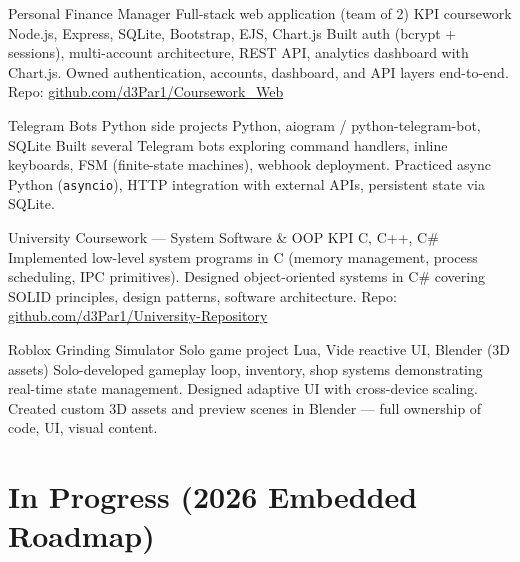\documentclass[11pt,a4paper,sans]{moderncv}
\begin{document}
        {Personal Finance Manager}
        {Full-stack web application (team of 2)}
        {KPI coursework}
        {Node.js, Express, SQLite, Bootstrap, EJS, Chart.js}
        {Built auth (bcrypt + sessions), multi-account architecture, REST API, analytics dashboard with Chart.js. Owned authentication, accounts, dashboard, and API layers end-to-end. Repo: \href{https://github.com/d3Par1/Coursework_Web}{github.com/d3Par1/Coursework\_Web}}

        {Telegram Bots}
        {Python side projects}
        {}
        {Python, aiogram / python-telegram-bot, SQLite}
        {Built several Telegram bots exploring command handlers, inline keyboards, FSM (finite-state machines), webhook deployment. Practiced async Python (\texttt{asyncio}), HTTP integration with external APIs, persistent state via SQLite.}

        {University Coursework — System Software \& OOP}
        {KPI}
        {}
        {C, C++, C\#}
        {Implemented low-level system programs in C (memory management, process scheduling, IPC primitives). Designed object-oriented systems in C\# covering SOLID principles, design patterns, software architecture. Repo: \href{https://github.com/d3Par1/University-Repository}{github.com/d3Par1/University-Repository}}

        {Roblox Grinding Simulator}
        {Solo game project}
        {}
        {Lua, Vide reactive UI, Blender (3D assets)}
        {Solo-developed gameplay loop, inventory, shop systems demonstrating real-time state management. Designed adaptive UI with cross-device scaling. Created custom 3D assets and preview scenes in Blender — full ownership of code, UI, visual content.}

\section{In Progress (2026 Embedded Roadmap)}
\end{document}
